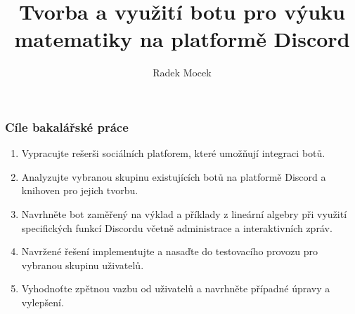\documentclass[FM]{tulpresentation}
\title{Tvorba a využití botu pro výuku matematiky na platformě Discord}
\author{Radek Mocek}
\institute{Ing. Igor Kopetschke}
\begin{document}
	\TULtitleframe
	\begin{frame}
		\frametitle{Cíle bakalářské práce}
		\begin{enumerate}
			\item Vypracujte rešerši sociálních platforem, které umožňují integraci botů.
			\item Analyzujte vybranou skupinu existujících botů na platformě Discord a knihoven pro jejich tvorbu.
			\item Navrhněte bot zaměřený na výklad a příklady z lineární algebry při využití specifických funkcí Discordu včetně administrace a interaktivních zpráv.
			\item Navržené řešení implementujte a nasaďte do testovacího provozu pro vybranou skupinu uživatelů.
			\item Vyhodnoťte zpětnou vazbu od uživatelů a navrhněte případné úpravy a vylepšení.
		\end{enumerate}
	\end{frame}	
\end{document}
